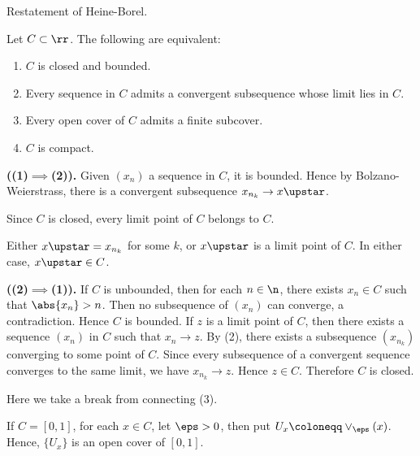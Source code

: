 

Restatement of Heine-Borel.

\begin{theorem}{
    Let $C\subset\rr$. The following are equivalent:
    \begin{enumerate}
        \item $C$ is closed and bounded.
        \item Every sequence in $C$ admits a convergent subsequence whose limit lies in $C$.
        \item Every open cover of $C$ admits a finite subcover.
        \item $C$ is compact.
    \end{enumerate}
}
	\textbf{((1)$\implies$(2)).}
    Given $(x_n)$ a sequence in $C$, it is bounded.
    Hence by Bolzano-Weierstrass, there is a convergent subsequence $x_{n_k}\to x\upstar$.

    \begin{remark}
        Since $C$ is closed, every limit point of $C$ belongs to $C$.
    \end{remark}

    Either $x\upstar = x_{n_k}$ for some $k$, or $x\upstar$ is a limit point of $C$.
    In either case, $x\upstar\in C$.

    \textbf{((2)$\implies$(1)).}
    If $C$ is unbounded, then for each $n\in\n$, there exists $x_n\in C$ such that $\abs{x_n} > n$.
    Then no subsequence of $(x_n)$ can converge, a contradiction.
    Hence $C$ is bounded.
    If $z$ is a limit point of $C$, then there exists a sequence $(x_n)$ in $C$ such that $x_n\to z$.
    By (2), there exists a subsequence $(x_{n_k})$ converging to some point of $C$.
    Since every subsequence of a convergent sequence converges to the same limit, we have $x_{n_k}\to z$.
    Hence $z\in C$.
    Therefore $C$ is closed.

    \begin{remark}
        Here we take a break from connecting (3).
    \end{remark}
\end{theorem}

\begin{example}
    If $C = [0,1]$, for each $x\in C$, let $\eps > 0$, then put $U_x \coloneqq \vee_{\eps} (x)$.
    Hence, $\{U_x\}$ is an open cover of $[0,1]$.
\end{example}

